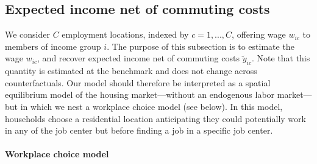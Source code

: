 \documentclass[12pt]{article}
\begin{document}

\subsection{Expected income net of commuting costs}

We consider $C$ employment locations, indexed by $c=1,...,C$, offering wage $w_{ic}$ to members of income group $i$. The purpose of this subsection is to estimate the wage $w_{ic}$, and recover expected income net of commuting costs $\tilde{y}_{ic}$. Note that this quantity is estimated at the benchmark and does not change across counterfactuals. Our model should therefore be interpreted as a spatial equilibrium model of the housing market---without an endogenous labor market---but in which we nest a workplace choice model (see below). In this model, households choose a residential location anticipating they could potentially work in any of the job center but before finding a job in a specific job center. %


\paragraph{Workplace choice model}
\end{document}
